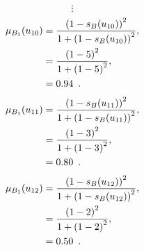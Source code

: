 \documentclass[a4paper,openany]{book}
\begin{document}
				\[
					\vdots
				\]
				\begin{align}
					\mu_{B_1}(u_{10}) &= \frac{\left(1-s_B(u_{10})\right)^2}{1 + \left(1-s_B(u_{10})\right)^2} ,\\
					&= \frac{\left(1-5\right)^2}{1 + \left(1-5\right)^2} \notag ,\\
					&= 0.94 \enspace. \notag
				\end{align}
				\begin{align}
					\mu_{B_1}(u_{11}) &= \frac{\left(1-s_B(u_{11})\right)^2}{1 + \left(1-s_B(u_{11})\right)^2} ,\\
					&= \frac{\left(1-3\right)^2}{1 + \left(1-3\right)^2} \notag ,\\
					&= 0.80 \enspace. \notag
				\end{align}
				\begin{align}
					\mu_{B_1}(u_{12}) &= \frac{\left(1-s_B(u_{12})\right)^2}{1 + \left(1-s_B(u_{12})\right)^2} ,\\
					&= \frac{\left(1-2\right)^2}{1 + \left(1-2\right)^2} \notag ,\\
					&= 0.50 \enspace. \notag
				\end{align}
\end{document}
